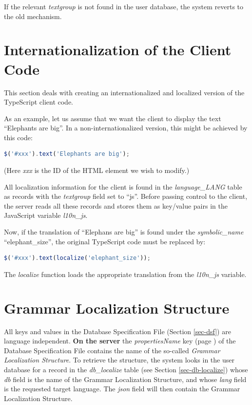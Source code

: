 \documentclass[11pt,oneside,a4paper]{memoir}
\begin{document}
If the relevant \emph{textgroup} is not found in the user database, the system reverts to the old
mechanism.




\section{Internationalization of the Client Code}\label{sec-localize-javascript}

This section deals with creating an internationalized and localized version of the TypeScript client
code.

As an example, let us assume that we want the client to display the text ``Elephants are big''. In a
non-internationalized version, this might be achieved by this code:

\begin{lstlisting}[language=TypeScript]
$('#xxx').text('Elephants are big');
\end{lstlisting}

(Here \emph{xxx} is the ID of the HTML element we wish to modify.)

All localization information for the client is found in the \emph{language\_LANG} table as records
with the \emph{textgroup} field set to ``js''. Before passing control to the client, the server
reads all these records and stores them as key/value pairs in the JavaScript variable
\emph{l10n\_js}.

Now, if the translation of ``Elephans are big'' is found under the \emph{symbolic\_name}
``elephant\_size'', the original TypeScript code must be replaced by:

\begin{lstlisting}[language=TypeScript]
$('#xxx').text(localize('elephant_size'));
\end{lstlisting}

The \emph{localize} function loads the appropriate translation from the \emph{l10n\_js} variable.


\section{Grammar Localization Structure}\label{sec-gram-loc-struct}


All keys and values in the Database Specification File (Section \ref{sec-dsf}) are language
independent. \textbf{On the server} the \emph{propertiesName} key (page \pageref{propname}) of the
Database Specification File contains the name of the so-called \emph{Grammar Localization
  Structure}. To retrieve the structure, the system looks in the user database for a record in the
\emph{db\_localize} table (see Section \ref{sec-db-localize}) whose \emph{db} field is the name of
the Grammar Localization Structure, and whose \emph{lang} field is the requested target language.
The \emph{json} field will then contain the Grammar Localization Structure.
\end{document}
